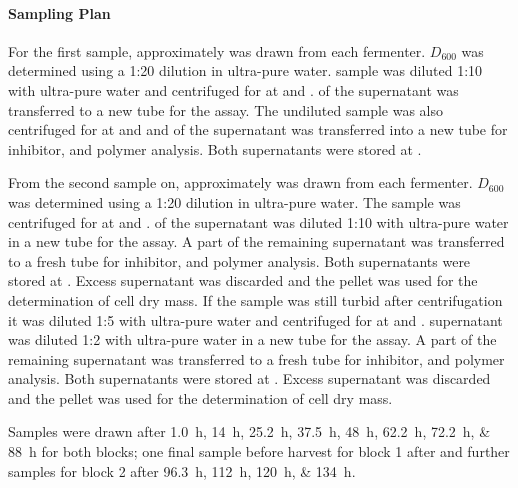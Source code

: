 \paragraph{Sampling Plan}
For the first sample, approximately  was drawn from each fermenter. $D_{600}$ was determined using a 1:20 dilution in ultra-pure water.  sample was diluted 1:10 with ultra-pure water and centrifuged for  at  and .  of the supernatant was transferred to a new tube for the \glc{} assay. The undiluted sample was also centrifuged for  at  and  and  of the supernatant was transferred into a new tube for inhibitor, \xyl{} and polymer analysis. Both supernatants were stored at . 

From the second sample on, approximately  was drawn from each fermenter. $D_{600}$ was determined using a 1:20 dilution in ultra-pure water. The sample was centrifuged for  at  and .  of the supernatant was diluted 1:10 with ultra-pure water in a new tube for the \glc{} assay. A part of the remaining supernatant was transferred to a fresh tube for inhibitor, \xyl{} and polymer analysis. Both supernatants were stored at . Excess supernatant was discarded and the pellet was used for the determination of cell dry mass. If the sample was still turbid after centrifugation it was diluted 1:5 with ultra-pure water and centrifuged for  at  and .  supernatant was diluted 1:2 with ultra-pure water in a new tube for the \glc{} assay. A part of the remaining supernatant was transferred to a fresh tube for inhibitor, \xyl{} and polymer analysis. Both supernatants were stored at . Excess supernatant was discarded and the pellet was used for the determination of cell dry mass.

Samples were drawn after \SIlist{1.0;14;25.2;37.5;48;62.2;72.2;88}{\hour} for both blocks; one final sample before harvest for block 1 after  and further samples for block 2 after \SIlist{96.3;112;120;134}{\hour}.

